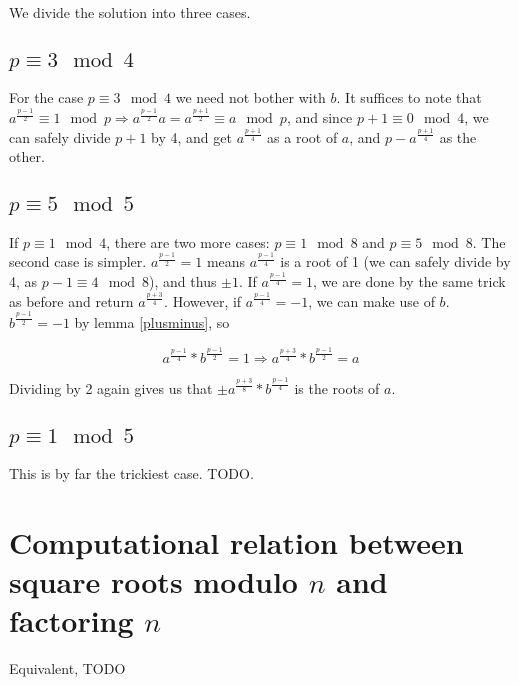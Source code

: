 \documentclass{article}
\begin{document}
We divide the solution into three cases.

\subsection{$p \equiv 3 \mod 4$}
For the case $p \equiv 3 \mod 4$ we need not bother with $b$. It suffices to
note that $a^{\frac{p-1}{2}} \equiv 1 \mod p \Rightarrow a^{\frac{p-1}{2}}a
= a^{\frac{p+1}{2}} \equiv a \mod p$, and since $p + 1 \equiv 0 \mod 4$, we can
safely divide $p+1$ by 4, and get $a^{\frac{p+1}{4}}$ as a root of $a$, and
$p - a^{\frac{p+1}{4}}$ as the other.

\subsection{$p \equiv 5 \mod 5$}
If $p \equiv 1 \mod 4$, there are two more cases: $p \equiv 1 \mod 8$ and $p
\equiv 5 \mod 8$. The second case is simpler. $a^{\frac{p-1}{2}} = 1$ means
$a^{\frac{p-1}{4}}$ is a root of 1 (we can safely divide by 4, as $p -1 \equiv 4
\mod 8$), and thus $\pm 1$. If $a^{\frac{p-1}{4}} = 1$, we are done by the same
trick as before and return $a^{\frac{p+3}{4}}$. However, if $a^{\frac{p-1}{4}} =
-1$, we can make use of $b$. $b^{\frac{p-1}{2}} = -1$ by lemma \ref{plusminus},
so

$$a^{\frac{p-1}{4}} * b^{\frac{p-1}{2}} = 1 \Rightarrow a^{\frac{p+3}{4}} *
b^{\frac{p-1}{2}} = a $$

Dividing by 2 again gives us that $\pm a^{\frac{p+3}{8}} * b^{\frac{p-1}{4}}$ is
the roots of $a$.

\subsection{$p \equiv 1 \mod 5$}
This is by far the trickiest case. TODO.

\section{Computational relation between square roots modulo $n$ and factoring $n$}
Equivalent, TODO
\end{document}
